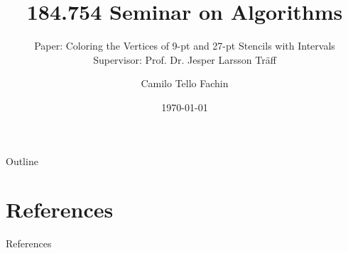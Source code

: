 \documentclass[10pt]{beamer}
\title[Seminar on Algorithms]{%
  184.754 Seminar on Algorithms 
}
\subtitle{Paper: Coloring the Vertices of 9-pt and 27-pt Stencils
with Intervals \\
\null
Supervisor: Prof. Dr. Jesper Larsson Träff}
\author{Camilo Tello Fachin}
\date{\today}
\begin{document}
\begin{frame}
  \titlepage
\end{frame}

\begin{frame}{Outline}
  \tableofcontents
\end{frame}













\section{References}
\begin{frame}{References}

  \tiny\printbibliography
  
\end{frame}
\end{document}
